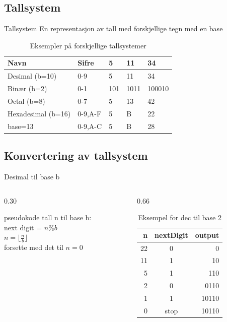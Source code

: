 \subsection*{Tallsystem}
\begin{frame}
\begin{block}{Tallsystem}
En representasjon av tall med forskjellige tegn med en base
\end{block}
\pause

\medskip

\begin{table}[]
\centering
\label{tab:tallsystemer}
\begin{tabular}{l|l|l|l|l}
Navn & Sifre & 5 & 11 & 34 \\ \hline
Desimal (b=10) & 0-9 & 5& 11 & 34 \\
Binær (b=2) & 0-1 & 101 & 1011 & 100010 \\
Octal (b=8) & 0-7 & 5&  13 & 42\\
Hexadesimal (b=16) & 0-9,A-F& 5& B& 22\\
base=13 & 0-9,A-C & 5& B& 28
\end{tabular}
\caption{Eksempler på forskjellige tallsystemer}
\end{table}
\end{frame}

\subsection*{Konvertering av tallsystem}
\begin{frame}[fragile]{Desimal til base b}
\begin{columns}
    \begin{column}{0.30\textwidth}
    \begin{block}{pseudokode}
            tall n til base b:\\
            next digit = $n\%b$\\
            $n=\lfloor\frac{n}{b}\rfloor$\\
            forsette med det til $n=0$
    \end{block}
    \end{column}
 	\pause
    \begin{column}{0.66\textwidth}
\begin{table}
\begin{tabular}{r|c|r}
n & nextDigit & output \\ \hline
22 & 0 & 0 \\
11 & 1 & 10\\
5 & 1 & 110\\
2 & 0 & 0110\\
1 & 1 & 10110\\
0 & stop & 10110
\end{tabular}
\caption{Eksempel for dec til base 2}
\end{table}
 	\end{column}
 	\end{columns}
\end{frame}

